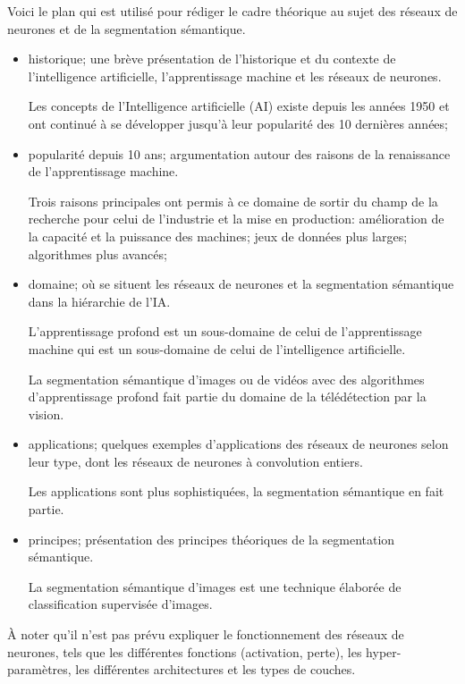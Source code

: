 ﻿{\color{red}
\par Voici le plan qui est utilisé pour rédiger le cadre théorique au sujet des réseaux de neurones et de la segmentation sémantique.
\begin{itemize}
   \item historique; une brève présentation de l'historique et du contexte de l'intelligence artificielle, l'apprentissage machine et les réseaux de neurones.
   \par Les concepts de l'Intelligence artificielle (AI) existe depuis les années 1950 et ont continué à se développer jusqu'à leur popularité des 10 dernières années;
   \item popularité depuis 10 ans; argumentation autour des raisons de la renaissance de l'apprentissage machine. 
   \par Trois raisons principales ont permis à ce domaine de sortir du champ de la recherche pour celui de l’industrie et la mise en production: amélioration de la capacité et la puissance des machines; jeux de données plus larges; algorithmes plus avancés;
   \item domaine; où se situent les réseaux de neurones et la segmentation sémantique dans la hiérarchie de l'IA.
   \par L’apprentissage profond est un sous-domaine de celui de l'apprentissage machine qui est un sous-domaine de celui de l'intelligence artificielle.
   \par La segmentation sémantique d'images ou de vidéos avec des algorithmes d'apprentissage profond fait partie du domaine de la télédétection par la vision.
   \item applications; quelques exemples d'applications des réseaux de neurones selon leur type, dont les réseaux de neurones à convolution entiers.
   \par Les applications sont plus sophistiquées, la segmentation sémantique en fait partie.
   \item principes; présentation des principes théoriques de la segmentation sémantique.
   \par La segmentation sémantique d'images est une technique élaborée de classification supervisée d'images.
\end{itemize}
À noter qu'il n'est pas prévu expliquer le fonctionnement des réseaux de neurones, tels que les différentes fonctions (activation, perte), les hyper-paramètres, les différentes architectures et les types de couches. 
}